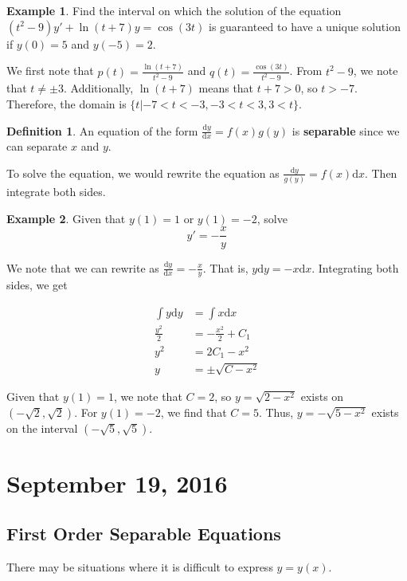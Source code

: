 \documentclass[11pt]{article}
\theoremstyle{plain} %
\theoremstyle{definition}
\newtheorem*{definition}{Definition} %
\theoremstyle{example}
\newtheorem*{example}{Example}
\theoremstyle{remark}
\begin{document}
\begin{example}
Find the interval on which the solution of the equation $\left(t^2-9\right)y' + \ln(t+7)y = \cos(3t)$ is guaranteed to have a unique solution if $y(0)=5$ and $y(-5) = 2$. 
\end{example}

We first note that $p(t) = \frac{\ln(t+7)}{t^2-9}$ and $q(t) = \frac{\cos(3t)}{t^2-9}$. From $t^2-9$, we note that $t \neq\pm 3$. Additionally, $\ln(t+7)$ means that $t+7 > 0$, so $t > -7$. Therefore, the domain is $\{t|-7 < t < -3, -3 < t < 3, 3<t\}$.

\begin{definition}
An equation of the form $\frac{\mathrm d y}{\mathrm d x} = f(x)g(y)$ is \textbf{separable} since we can separate $x$ and $y$. 
\end{definition}To solve the equation, we would rewrite the equation as $\frac{\mathrm d y}{g(y)} = f(x) \mathrm d x$. Then integrate both sides. 


\begin{example}
Given that $y(1) = 1$ or $y(1) = -2$, solve $$y' = -\frac{x}{y}$$
\end{example}

We note that we can rewrite as $\frac{\mathrm d y}{\mathrm d x} = -\frac{x}{y}$. That is, $y\mathrm d y = -x\mathrm d x$. Integrating both sides, we get 

\begin{align*}
\int y\mathrm d y &= \int x \mathrm d x\\
\frac{y^2}{2} &= -\frac{x^2}{2} + C_1 \\
y^2 &= 2C_1-x^2 \\
y &= \pm \sqrt{C-x^2}
\end{align*}

Given that $y(1)=1$, we note that $C = 2$, so $y = \sqrt{2-x^2}$ exists on $(-\sqrt{2}, \sqrt{2})$. For $y(1) = -2$, we find that $C = 5$. Thus, $y=-\sqrt{5-x^2}$ exists on the interval $(-\sqrt{5}, \sqrt{5})$.

\section{September 19, 2016}
\subsection{First Order Separable Equations}

There may be situations where it is difficult to express $y=y(x)$. 
\end{document}
